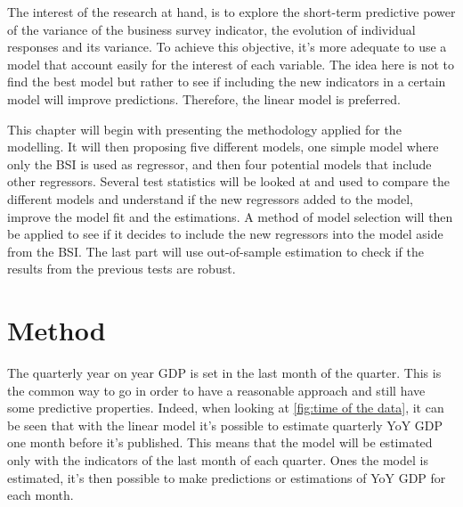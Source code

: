 \documentclass[12pt,a4paper,oneside]{book}
\begin{document}
The interest of the research at hand, is to explore the short-term predictive power of the variance of the business survey indicator, the evolution of individual responses and its variance.
To achieve this objective, it's more adequate to use a model that account easily for the interest of each variable. The idea here is not to find the best model but rather to see if including the new indicators in a certain model will improve predictions.
Therefore, the linear model is preferred.

This chapter will begin with presenting the methodology applied for the modelling.
It will then proposing five different models, one simple model where only the BSI is used as regressor, and then four potential models that include other regressors.
Several test statistics will be looked at and used to compare the different models and understand if the new regressors added to the model, improve the model fit and the estimations.
A method of model selection will then be applied to see if it decides to include the new regressors into the model aside from the BSI.
The last part will use out-of-sample estimation to check if the results from the previous tests are robust.

\section{Method}

The quarterly year on year GDP is set in the last month of the quarter. This is the common way to go in order to have a reasonable approach and still have some predictive properties.
Indeed, when looking at \autoref{fig:time of the data}, it can be seen that with the linear model it's possible to estimate quarterly YoY GDP one month before it's published. 
This means that the model will be estimated only with the indicators of the last month of each quarter. 
Ones the model is estimated, it's then possible to make predictions or estimations of YoY GDP for each month.
\end{document}
